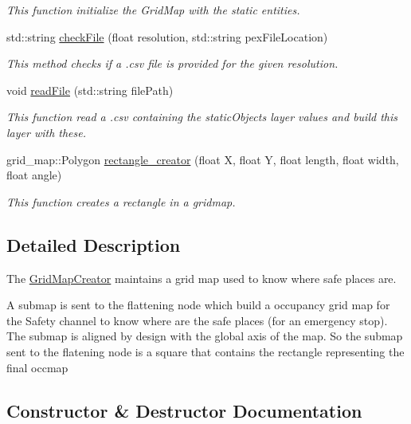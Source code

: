\begin{DoxyCompactItemize}
\begin{DoxyCompactList}\small\item\em This function initialize the Grid\+Map with the static entities. \end{DoxyCompactList}\item 
std\+::string \hyperlink{classGridMapCreator_ad0a7d37228e112102174dcf0629a95a2}{check\+File} (float resolution, std\+::string pex\+File\+Location)
\begin{DoxyCompactList}\small\item\em This method checks if a .csv file is provided for the given resolution. \end{DoxyCompactList}\item 
void \hyperlink{classGridMapCreator_a9548502241b075beaa07b23c95428711}{read\+File} (std\+::string file\+Path)
\begin{DoxyCompactList}\small\item\em This function read a .csv containing the static\+Objects layer values and build this layer with these. \end{DoxyCompactList}\item 
grid\+\_\+map\+::\+Polygon \hyperlink{classGridMapCreator_a539fd0f37ec502def07c5cd2d83402eb}{rectangle\+\_\+creator} (float X, float Y, float length, float width, float angle)
\begin{DoxyCompactList}\small\item\em This function creates a rectangle in a gridmap. \end{DoxyCompactList}\end{DoxyCompactItemize}


\subsection{Detailed Description}
The \hyperlink{classGridMapCreator}{Grid\+Map\+Creator} maintains a grid map used to know where safe places are. 

A submap is sent to the flattening node which build a occupancy grid map for the Safety channel to know where are the safe places (for an emergency stop). The submap is aligned by design with the global axis of the map. So the submap sent to the flatening node is a square that contains the rectangle representing the final occmap 

\subsection{Constructor \& Destructor Documentation}
\mbox{\label{classGridMapCreator_a5df28e4b4af91aa6b0b11bca03264062}} 
